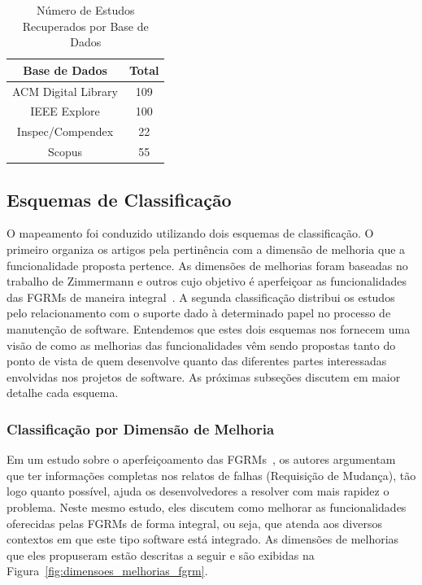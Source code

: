 \begin{table}[htb]
	\centering
	\begin{tabular}{cc}
		\toprule
		\textbf{Base de Dados} & \textbf{Total} \\
		\midrule
	   	ACM Digital Library & 109\\
	   	IEEE Explore        & 100\\
		Inspec/Compendex    & 22 \\ 
		Scopus              & 55 \\
		\bottomrule
	\end{tabular}
	\caption{Número de Estudos Recuperados por Base de Dados}
\label{tab:estudos-por-base-dados}
\end{table}

\subsection{Esquemas de Classificação}
\label{subsec:map-esquemas-classificacao}

O mapeamento foi conduzido utilizando dois esquemas de classificação. O primeiro
organiza os artigos pela pertinência com a dimensão de melhoria que a
funcionalidade proposta pertence. As dimensões de melhorias foram baseadas no
trabalho de Zimmermann e outros cujo objetivo é aperfeiçoar as funcionalidades
das FGRMs de maneira integral~\cite{zimmermann2009improving}. A segunda
classificação distribui os estudos pelo relacionamento com o suporte dado à
determinado papel no processo de manutenção de software. Entendemos que estes
dois esquemas nos fornecem uma visão de como as melhorias das funcionalidades
vêm sendo propostas tanto do ponto de vista de quem desenvolve quanto das
diferentes partes interessadas envolvidas nos projetos de software.  As
pró\-xi\-mas subseções discutem em maior detalhe cada esquema.

\subsubsection{Classificação por Dimensão de Melhoria}
\label{subsubsec:map-esquema-suporte-problema}

Em um estudo sobre o aperfeiçoamento das FGRMs~\cite{zimmermann2009improving},
os autores argumentam que ter informações completas nos relatos de falhas
(Requisição de Mudança), tão logo quanto possível, ajuda os desenvolvedores a
resolver com mais rapidez o problema. Neste mesmo estudo, eles discutem como
melhorar as funcionalidades oferecidas pelas FGRMs de forma integral, ou seja,
que atenda aos diversos contextos em que este tipo software está integrado. As
dimensões de melhorias que eles propuseram estão descritas a seguir e são
exibidas na Figura~\ref{fig:dimensoes_melhorias_fgrm}.

